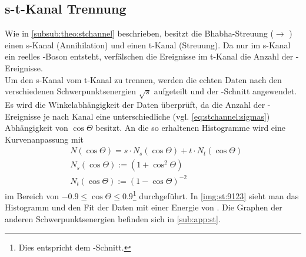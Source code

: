 \subsection{s-t-Kanal Trennung}
Wie in \autoref{subsub:theo:stchannel} beschrieben, besitzt die Bhabha-Streuung (\ee $\to$ \ee) einen s-Kanal (Annihilation)
und einen t-Kanal (Streuung). Da nur im s-Kanal ein reelles \Z -Boson entsteht, verfälschen die Ereignisse im t-Kanal die Anzahl
der \ee -Ereignisse. \\
Um den s-Kanal vom t-Kanal zu trennen, werden die echten Daten nach den verschiedenen Schwerpunktsenergien $\sqrt{s}$ aufgeteilt und
der \ee -Schnitt angewendet. Es wird die Winkelabhängigkeit der Daten überprüft, da die Anzahl der \ee -Ereignisse
je nach Kanal eine unterschiedliche (vgl. \autoref{eq:stchannel:sigmas}) Abhängigkeit von $\cos \Theta$ besitzt. 
An die so erhaltenen Histogramme wird eine Kurvenanpassung mit
\begin{equation}
    \begin{split}
        & N(\cos \Theta) = s \cdot N_s(\cos \Theta ) + t \cdot N_t(\cos \Theta) \\
        & N_s(\cos \Theta) := \left( 1 + \cos^2 \Theta \right) \\
        & N_t (\cos \Theta) := \left( 1 - \cos \Theta \right)^{-2}
    \end{split}
\end{equation}
im Bereich von $-0.9 \leq \cos \Theta \leq 0.9$\footnote{Dies entspricht dem \ee -Schnitt.} durchgeführt. In \autoref{img:st:9123} sieht man
das Histogramm und den Fit der Daten mit einer Energie von . Die Graphen der anderen Schwerpunktsenergien befinden sich in
\autoref{sub:app:st}.

